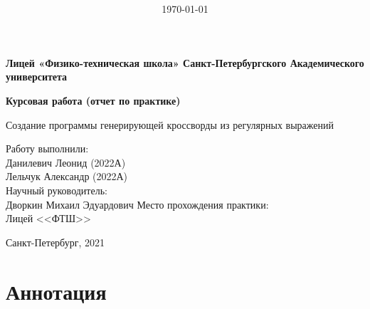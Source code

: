 \documentclass[12pt]{article}
\title{\bf \ReportTheme}
\author{\it \ReportAuthor}
\date{\today}
\begin{document}

    \begin{center}
    \large { {\bf Лицей «Физико-техническая школа»  Санкт-Петербургского Академического университета   } } 
    
    \vspace*{6\baselineskip}
    
    \large { {\bf Курсовая работа (отчет по практике) } } 
    
    \vspace*{6\baselineskip}
    
    Создание программы генерирующей кроссворды из регулярных выражений \\
    \vspace*{3\baselineskip}
    
    \end{center}        
    \begin{flushright}
        Работу выполнили: \\
        Данилевич Леонид (2022А) \\
        Лельчук Александр (2022А) \\
        Научный руководитель: \\
        Дворкин Михаил Эдуардович
        Место прохождения практики: \\
        Лицей <<ФТШ>>
    \end{flushright}
    \vspace*{5\baselineskip}
    \begin{center}
        Санкт-Петербург, 2021
    \end{center}        
    \newpage %
\section{Аннотация}
    
    \newpage %
\tableofcontents
    \newpage %
\end{document}
